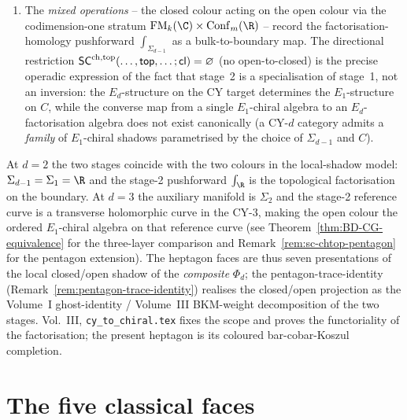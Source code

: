 \begin{lemma}
\begin{enumerate}[label=\textup{(\roman*)}]
${\SpCh}_{\Sigma_{d-1},C}\circ\PhiFA_d(\cC)$ landing on the
reference curve $C$. It is $E_1$-chiral, not $E_d$, because
factorisation-homology pushforward along $\Sigma_{d-1}$
collapses $d - 1$ topological directions, leaving a
single holomorphic direction along $C$ and a single
topological direction along $\R\subset C\times\R$.
\item The \emph{mixed operations} -- the closed colour acting on
the open colour via the codimension-one stratum
$\FM_k(\C)\times\Conf_m(\R)$ -- record the factorisation-homology
pushforward $\int_{\Sigma_{d-1}}$ as a bulk-to-boundary map. The
directional restriction $\mathsf{SC}^{\mathrm{ch},\mathrm{top}}(\ldots,\mathsf{top},\ldots;
\mathsf{cl})=\varnothing$ (no open-to-closed) is the precise
operadic expression of the fact that stage~2 is a specialisation of
stage~1, not an inversion: the $E_d$-structure on the CY target
determines the $E_1$-structure on $C$, while the converse map
from a single $E_1$-chiral algebra to an $E_d$-factorisation
algebra does not exist canonically (a CY-$d$ category admits a
\emph{family} of $E_1$-chiral shadows parametrised by the choice
of $\Sigma_{d-1}$ and $C$).
\end{enumerate}
At $d = 2$ the two stages coincide with the two colours in the
local-shadow model: $\Sigma_{d-1} = \Sigma_1 = \R$ and the stage-2
pushforward $\int_\R$ is the topological factorisation on the
boundary. At $d = 3$ the auxiliary manifold is
$\Sigma_2$ and the stage-2 reference curve is a transverse holomorphic
curve in the CY-$3$, making the open colour the ordered $E_1$-chiral
algebra on that reference curve (see
Theorem~\ref{thm:BD-CG-equivalence} for the three-layer comparison
and Remark~\ref{rem:sc-chtop-pentagon} for the pentagon extension).
The heptagon faces are thus seven presentations of the local
closed/open shadow of the \emph{composite} $\Phi_d$; the
pentagon-trace-identity
(Remark~\ref{rem:pentagon-trace-identity}) realises the closed/open
projection as the Volume~I ghost-identity / Volume~III BKM-weight
decomposition of the two stages. Vol.~III,
\texttt{cy\_to\_chiral.tex} fixes the scope and proves the functoriality
of the factorisation; the present heptagon is its coloured
bar-cobar-Koszul completion.
\end{lemma}

\section{The five classical faces}
\label{sec:five-classical-faces}

